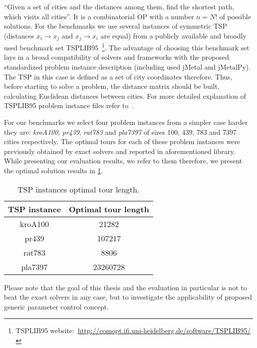 ``Given a set of cities and the distances among them, find the shortest path, which visits all cities''. It is a combinatorial OP with a number $n = N!$ of possible solutions. For the benchmarks we use several instances of symmetric TSP (distances $x_i \rightarrow x_j$ and $x_j \rightarrow x_i$ are equal) from a publicly available and broadly used benchmark set TSPLIB95~\footnote{TSPLIB95 website:~\url{http://comopt.ifi.uni-heidelberg.de/software/TSPLIB95/}}. The advantage of choosing this benchmark set lays in a broad compatibility of solvers and frameworks with the proposed standardized problem instance description (including used jMetal and jMetalPy). The TSP in this case is defined as a set of city coordinates therefore. Thus, before starting to solve a problem, the distance matrix should be built, calculating Euclidean distances between cities. For more detailed explanation of TSPLIB95 problem instance files refer to~\cite{reinelt1995tsplib95}.

For our benchmarks we select four problem instances from a simpler case harder they are: \emph{kroA100}, \emph{pr439}, \emph{rat783} and \emph{pla7397} of sizes 100, 439, 783 and 7397 cities respectively. The optimal tours for each of these problem instances were previously obtained by exact solvers and reported in aforementioned library. While presenting our evaluation results, we refer to them therefore, we present the optimal solution results in \cref{eval:table:tsp optimal tour length}.

\begin{table}[h!]
	\centering
	\begin{tabular}{c||c}
		\textbf{TSP instance} & \textbf{Optimal tour length} \\
		\hline
		\hline
		kroA100 & 21282 \\
		pr439 & 107217 \\
		rat783 & 8806 \\
		pla7397 & 23260728 \\
	\end{tabular}
	\caption{TSP instances optimal tour length.}
	\label{eval:table:tsp optimal tour length}
\end{table}

Please note that the goal of this thesis and the evaluation in particular is not to beat the exact solvers in any case, but to investigate the applicability of proposed generic parameter control concept.


